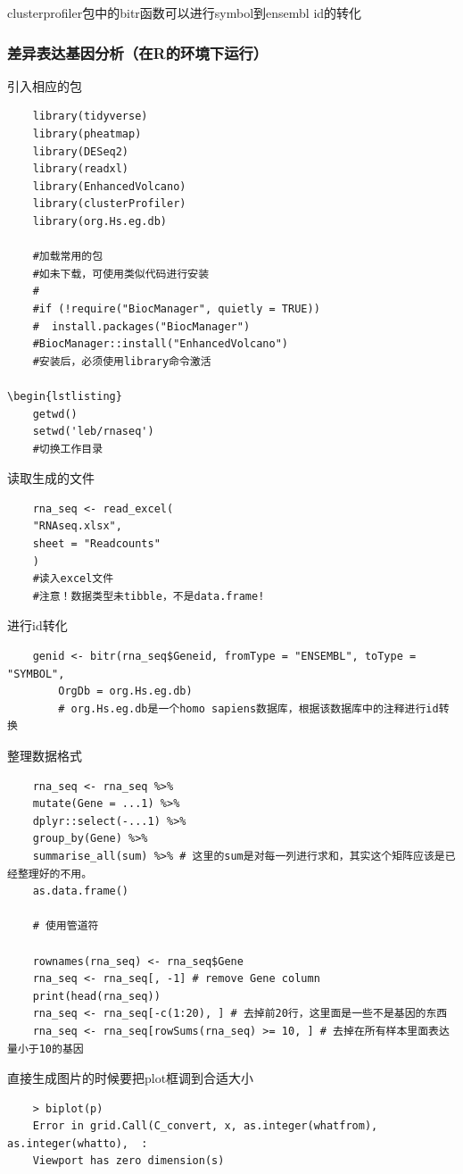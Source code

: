 clusterprofiler包中的bitr函数可以进行symbol到ensembl id的转化

\subsubsection{差异表达基因分析（在R的环境下运行）}

引入相应的包
\begin{lstlisting}
    library(tidyverse)
    library(pheatmap)
    library(DESeq2)
    library(readxl)
    library(EnhancedVolcano)
    library(clusterProfiler)
    library(org.Hs.eg.db)

    #加载常用的包
    #如未下载，可使用类似代码进行安装
    #
    #if (!require("BiocManager", quietly = TRUE))
    #  install.packages("BiocManager")
    #BiocManager::install("EnhancedVolcano")
    #安装后，必须使用library命令激活

\begin{lstlisting}
    getwd()
    setwd('leb/rnaseq')
    #切换工作目录
\end{lstlisting}

读取生成的文件
\begin{lstlisting}
    rna_seq <- read_excel(
    "RNAseq.xlsx",
    sheet = "Readcounts"
    )
    #读入excel文件
    #注意！数据类型未tibble，不是data.frame!
\end{lstlisting}

进行id转化
\begin{lstlisting}
    genid <- bitr(rna_seq$Geneid, fromType = "ENSEMBL", toType = "SYMBOL",
        OrgDb = org.Hs.eg.db)
        # org.Hs.eg.db是一个homo sapiens数据库，根据该数据库中的注释进行id转换

\end{lstlisting}

整理数据格式
\begin{lstlisting}
    rna_seq <- rna_seq %>%
    mutate(Gene = ...1) %>%
    dplyr::select(-...1) %>%
    group_by(Gene) %>%
    summarise_all(sum) %>% # 这里的sum是对每一列进行求和，其实这个矩阵应该是已经整理好的不用。
    as.data.frame()

    # 使用管道符

    rownames(rna_seq) <- rna_seq$Gene
    rna_seq <- rna_seq[, -1] # remove Gene column
    print(head(rna_seq))
    rna_seq <- rna_seq[-c(1:20), ] # 去掉前20行，这里面是一些不是基因的东西
    rna_seq <- rna_seq[rowSums(rna_seq) >= 10, ] # 去掉在所有样本里面表达量小于10的基因
\end{lstlisting}

直接生成图片的时候要把plot框调到合适大小
\begin{lstlisting}
    > biplot(p)
    Error in grid.Call(C_convert, x, as.integer(whatfrom), as.integer(whatto),  :
    Viewport has zero dimension(s)
\end{lstlisting}

